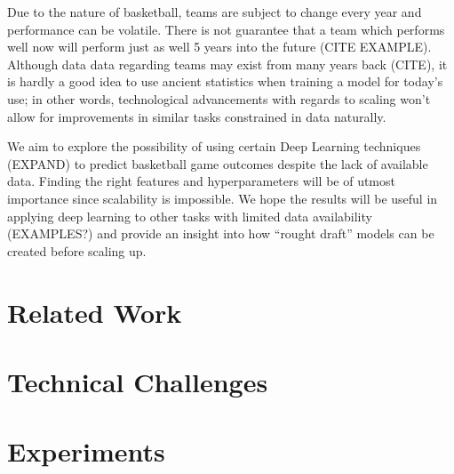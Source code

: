 \documentclass[10pt,twocolumn,letterpaper]{article}
\begin{document}
Due to the nature of basketball, teams are subject to change every year and performance
can be volatile. There is not guarantee that a team which performs well now will perform
just as well 5 years into the future (CITE EXAMPLE). Although data data regarding teams
may exist from many years back (CITE), it is hardly a good idea to use ancient statistics
when training a model for today's use; in other words, technological advancements
with regards to scaling won't allow for improvements in similar tasks constrained
in data naturally.

We aim to explore the possibility of using certain Deep Learning techniques (EXPAND)
to predict basketball game outcomes despite the lack of available data. Finding the right
features and hyperparameters will be of utmost importance since scalability is impossible.
We hope the results will be useful in applying deep learning to other tasks with limited
data availability (EXAMPLES?) and provide an insight into how ``rought draft'' models
can be created before scaling up.

\section{Related Work}


\section{Technical Challenges}


\section{Experiments}













{\small


}
\end{document}
